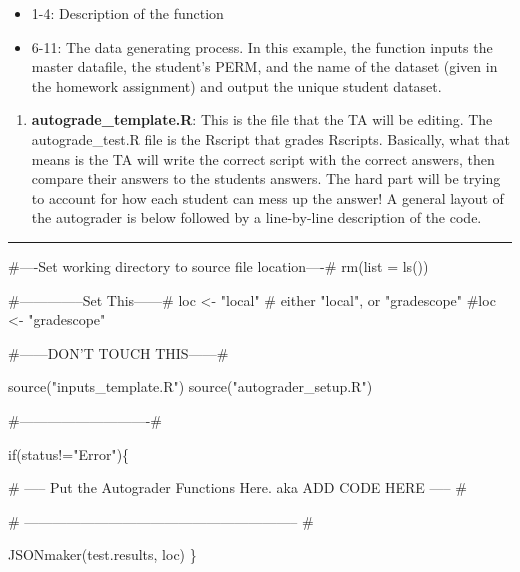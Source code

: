 \documentclass[
]{article}
\newenvironment{Shaded}{}{}
\newcommand{\CommentTok}[1]{\textcolor[rgb]{0.00,0.50,0.00}{#1}}
\newcommand{\ControlFlowTok}[1]{\textcolor[rgb]{0.00,0.00,1.00}{#1}}
\newcommand{\DataTypeTok}[1]{#1}
\newcommand{\KeywordTok}[1]{\textcolor[rgb]{0.00,0.00,1.00}{#1}}
\newcommand{\NormalTok}[1]{#1}
\newcommand{\OperatorTok}[1]{#1}
\newcommand{\StringTok}[1]{\textcolor[rgb]{0.00,0.50,0.50}{#1}}
\providecommand{\tightlist}{%
  \setlength{\itemsep}{0pt}\setlength{\parskip}{0pt}}
\begin{document}
\begin{itemize}
\tightlist
\item
  1-4: Description of the function
\item
  6-11: The data generating process. In this example, the function
  inputs the master datafile, the student's PERM, and the name of the
  dataset (given in the homework assignment) and output the unique
  student dataset.
\end{itemize}

\begin{enumerate}
\def\labelenumi{(\arabic{enumi})}
\setcounter{enumi}{5}
\tightlist
\item
  \textbf{autograde\_template.R}: This is the file that the TA will be
  editing. The autograde\_test.R file is the Rscript that grades
  Rscripts. Basically, what that means is the TA will write the correct
  script with the correct answers, then compare their answers to the
  students answers. The hard part will be trying to account for how each
  student can mess up the answer! A general layout of the autograder is
  below followed by a line-by-line description of the code.
\end{enumerate}

\begin{center}\rule{0.5\linewidth}{0.5pt}\end{center}

\hypertarget{numCode}{%
\label{numCode}}%
\begin{Shaded}
\begin{Highlighting}[numbers=left,,]
\CommentTok{#----Set working directory to source file location----#}
\KeywordTok{rm}\NormalTok{(}\DataTypeTok{list =} \KeywordTok{ls}\NormalTok{())}

\CommentTok{#--------------Set This------#}
\NormalTok{loc       <-}\StringTok{ "local"} \CommentTok{# either "local", or "gradescope"}
\CommentTok{#loc       <- "gradescope"}


\CommentTok{#------DON'T TOUCH THIS------#}

\KeywordTok{source}\NormalTok{(}\StringTok{"inputs_template.R"}\NormalTok{)}
\KeywordTok{source}\NormalTok{(}\StringTok{"autograder_setup.R"}\NormalTok{)}

\CommentTok{#----------------------------#}



\ControlFlowTok{if}\NormalTok{(status}\OperatorTok{!=}\StringTok{"Error"}\NormalTok{)\{}

    \CommentTok{# ----- Put the Autograder Functions Here. aka ADD CODE HERE ----- #}
    
 
    
    \CommentTok{# ----------------------------------------------------------- #}

    \KeywordTok{JSONmaker}\NormalTok{(test.results, loc)}
\NormalTok{\}}
\end{Highlighting}
\end{Shaded}
\end{document}
